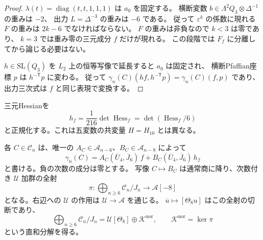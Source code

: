 \begin{proof}
$\lambda(t)=\operatorname{diag}(t,t,1,1,1)$ は $a_0$ を固定する。
横断変数 $b\in\Lambda^2Q_3\otimes\Delta^{-1}$ の重みは $-2$、
出力 $L=\Delta^{-3}$ の重みは $-6$ である。
従って $\varepsilon^k$ の係数に現れる $F$ の重みは $2k-6$ でなければならない。
$F$ の重みは非負なので $k<3$ は零であり、
$k=3$ では重み零の三元成分 $f$ だけが現れる。
この段階では $F_f$ に分離してから論じる必要はない。

$h\in\mathrm{SL}(Q_3)$ を $L_2$ 上の恒等写像で延長すると $a_0$ は固定され、
横断Pfaffian座標 $p$ は $h^{-\mathsf T}p$ に変わる。
従って
$\gamma_n(C)(hf,h^{-\mathsf T}p)=\gamma_n(C)(f,p)$
であり、出力三次式は $f$ と同じ表現で変換する。
\end{proof}

三元Hessianを
\[
 h_f=\frac1{216}\det\operatorname{Hess}_f
     =\det(\operatorname{Hess}_f/6)
\]
と正規化する。これは五変数の共変量 $H=H_{10}$ とは異なる。

\begin{theorem}[横断三次項が与える全次数の分裂射影]
\label{thm:v17-split-normal-projection}
各 $C\in\mathcal C_n$ は、唯一の
$A_C\in\mathcal A_{n-6}$、$B_C\in\mathcal A_{n-8}$ によって
\begin{equation}\label{eq:v17-normal-covariant-decomposition}
 \gamma_n(C)=A_C(\overline U_4,\overline J_6)\,f
            +B_C(\overline U_4,\overline J_6)\,h_f
\end{equation}
と書ける。負の次数の成分は零とする。
写像 $C\mapsto B_C$ は通常商に降り、次数付き $\mathcal U$ 加群の全射
\begin{equation}\label{eq:v17-normal-projection}
 \pi:\bigoplus_{n\ge6}\mathcal C_n/J_n
       \longrightarrow\mathcal A[-8]
\end{equation}
となる。右辺への $\mathcal U$ の作用は $\mathcal U\to\mathcal A$ を通じる。
$\overline u\mapsto[\Theta_8u]$ はこの全射の切断であり、
\begin{equation}\label{eq:v17-normal-splitting}
 \bigoplus_{n\ge6}\mathcal C_n/J_n
   =\mathcal U[\Theta_8]\oplus\mathcal K^{\mathrm{nor}},
 \qquad \mathcal K^{\mathrm{nor}}=\ker\pi
\end{equation}
という直和分解を得る。
\end{theorem}

